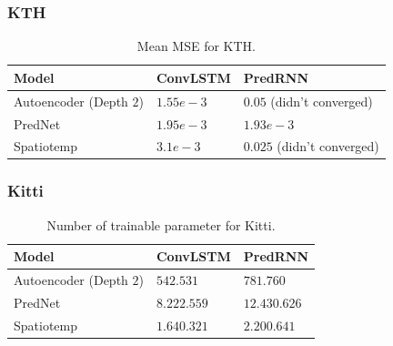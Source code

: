   \begin{frame}
   \frametitle{KTH}
   
   \begin{table}[H]
    \begin{center}
     \begin{tabular}{| l | l | l |}\hline
      \textbf{Model} & \textbf{ConvLSTM} & \textbf{PredRNN} \\\hline
      Autoencoder (Depth $2$) & $1.55e-3$ & $0.05$ (didn't converged) \\\hline
      PredNet & $1.95e-3$ & $1.93e-3$ \\\hline
      Spatiotemp & $3.1e-3$ & $0.025$ (didn't converged) \\\hline
     \end{tabular}
    \end{center}
    \caption{Mean MSE for KTH.}
   \end{table}  
   
  \end{frame}
  \begin{frame}
   \frametitle{Kitti}
   
   \begin{table}[H]
    \begin{center}
     \begin{tabular}{| l | l | l |}\hline
      \textbf{Model} & \textbf{ConvLSTM} & \textbf{PredRNN} \\\hline
      Autoencoder (Depth $2$) & $542.531$ & $781.760$ \\\hline
      PredNet & $8.222.559$ & $12.430.626$ \\\hline
      Spatiotemp & $1.640.321$ & $2.200.641$ \\\hline
     \end{tabular}
    \end{center}
    \caption{Number of trainable parameter for Kitti.}
   \end{table} 
   
  \end{frame}
